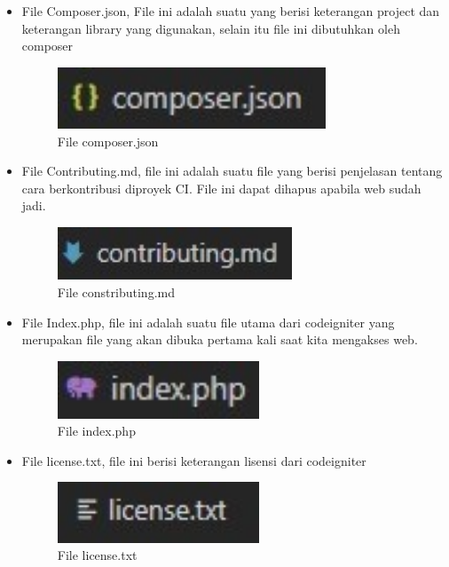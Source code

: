 \begin{itemize}
\begin{itemize}
		\item File Composer.json, File ini adalah suatu yang berisi keterangan project dan keterangan library yang digunakan, selain itu file ini dibutuhkan oleh composer		
		\begin{figure}[H]
			\includegraphics[width=8cm]{figures/instalasi/ci12.jpg}
			\centering
			\caption{File composer.json}
		\end{figure}
		
		\item File Contributing.md, file ini adalah suatu file yang berisi penjelasan tentang cara berkontribusi diproyek CI. File ini dapat dihapus apabila web sudah jadi.		
		\begin{figure}[H]
			\includegraphics[width=7cm]{figures/instalasi/ci13.jpg}
			\centering
			\caption{File constributing.md}
		\end{figure}		

		\item File Index.php, file ini adalah suatu file utama dari codeigniter yang merupakan file yang akan dibuka pertama kali saat kita mengakses web.		
		\begin{figure}[H]
			\includegraphics[width=6cm]{figures/instalasi/ci14.jpg}
			\centering
			\caption{File index.php}
		\end{figure}

		\item File license.txt, file ini berisi keterangan lisensi dari codeigniter	
		\begin{figure}[H]
			\includegraphics[width=6cm]{figures/instalasi/ci15.jpg}
			\centering
			\caption{File license.txt}
		\end{figure}
		

\end{itemize}
\end{itemize}
